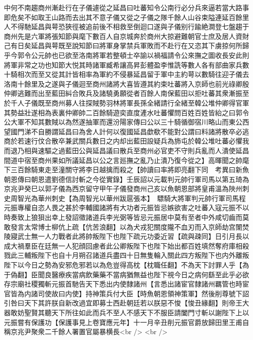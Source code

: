 中何不南趨商州漸赴行在子儀遽從之延昌曰吐蕃知令公南行必分兵來逼若當大路事即危矣不如取王山路而去出其不意子儀又從之子儀之隊千餘人山谷束隘連延百餘里人不得馳延昌與萼恐狹徑被追前後不相救至倒迴口遂與子儀别行踰絶澗登七盤趨于商州先是六軍將張知節與麾下數百人自京城奔於商州大掠避難朝官士庶及居人資財己有日矣延昌與萼既至說知節曰將軍身掌禁兵軍敗而不赴行在又恣其下虜掠何所歸乎今郭令公元帥也已欲至洛南將軍若整頓士卒諭以禍福請令公來撫之圖收長安此則將軍非常之功也知節大悦其時諸軍臧希讓高昇彭體盈李惟詵等數人各有部曲家兵數十騎相次而至又從其計皆相率為軍約不侵暴延昌留于軍中主約萼以數騎往迎子儀去洛南十餘里及之遂與子儀迴至商州諸將大喜皆遵其約束吐蕃將入京師也前光祿卿殷仲卿逃難而出至藍田糾合敗兵及諸驍勇願從者百餘人南保藍田以拒吐蕃其衆漸振至於千人子儀既至商州募人往探賊勢羽林將軍長孫全緒請行全緒至韓公堆仲卿得官軍其勢益壯遂相為表裏仲卿帥二百餘騎遊奕直度滻水吐蕃懼問百姓百姓皆紿之曰郭令公大軍不知其數賊以為然遂抽軍而還汾陽家傳曰公以三十騎循御宿川略山而東公西望國門涕不自勝謂延昌曰為舍人計何以復國延昌歔欷不能對公謂曰料諸將散卒必逃商於若速行伩合散卒兼武關兵數日之内却出藍田設疑兵為斾屯於韓公堆吐蕃必懼我而退乃相與速驅之過藍田公與延昌議曰散兵至商州必官吏不守則兵亂而人潰使延昌間道中宿至商州果如所議延昌以公之言廵撫之亂乃止潰乃復今從之】高暉聞之帥麾下三百餘騎東走至潼關守將李日越擒而殺之【帥讀曰率將即亮翻下同　考異曰新魚朝恩傳曰朝恩遣劉德信討斬之今從實錄】壬辰詔以元載判元帥行軍司馬以第五琦為京兆尹癸巳以郭子儀為西京留守甲午子儀發商州己亥以魚朝恩部將皇甫溫為陜州刺史周智光為華州刺史【為周智光以華州跋扈張本】　驃騎大將軍判元帥行軍司馬程元振專權自恣人畏之甚於李輔國諸將有大功者元振皆忌嫉欲害之吐蕃入寇元振不以時奏致上狼狽出幸上發詔徵諸道兵李光弼等皆忌元振居中莫有至者中外咸切齒而莫敢發言太常博士柳伉上疏【伉苦浪翻】以為犬戎犯關度隴不血刃而入京師劫宫闈焚陵寢武士無一人力戰者此將帥叛陛下也陛下疏元功委近習【疏與疎同】日引月長以成大禍羣臣在廷無一人犯顔回慮者此公卿叛陛下也陛下始出都百姓填然奪府庫相殺戮此三輔叛陛下也自十月朔召諸道兵盡四十日無隻輪入關此四方叛陛下也内外離叛陛下以今日之勢為安邪危邪若以為危豈得高枕【枕職任翻】不為天下討罪人乎【為于偽翻】臣聞良醫療疾當病飲藥藥不當病猶無益也陛下視今日之病何繇至此乎必欲存宗廟社稷獨斬元振首馳告天下悉出内使隸諸州【言悉出諸宦官隸諸州羈管也時宦官皆為内諸司使故曰内使】持神策兵付大臣【時魚朝恩領神策軍】然後削尊號下詔引咎曰天下其許朕自新改過宜即募士西赴朝廷若以朕惡不悛【悛丑緣翻】則帝王大器敢妨聖賢其聽天下所往如此而兵不至人不感天下不服臣請闔門寸斬以謝陛下上以元振嘗有保護功【保護事見上卷寶應元年】十一月辛丑削元振官爵放歸田里王甫自稱京兆尹聚衆二千餘人署置官屬暴横長<br />
<br />
